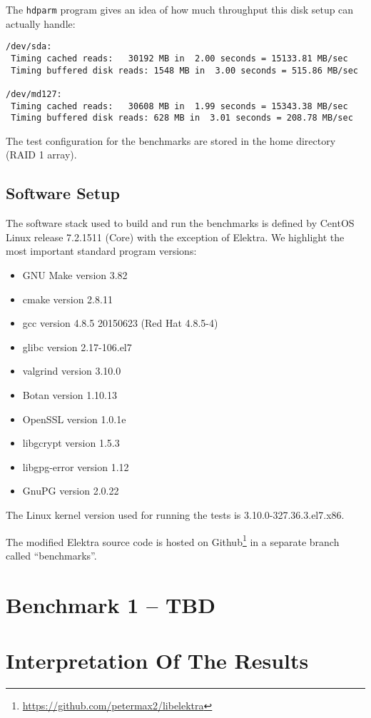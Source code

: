 The \texttt{hdparm} program gives an idea of how much throughput this disk setup can actually handle:

\begin{lstlisting}[caption={Disk performance on the benchmark machine}]
/dev/sda:
 Timing cached reads:   30192 MB in  2.00 seconds = 15133.81 MB/sec
 Timing buffered disk reads: 1548 MB in  3.00 seconds = 515.86 MB/sec

/dev/md127:
 Timing cached reads:   30608 MB in  1.99 seconds = 15343.38 MB/sec
 Timing buffered disk reads: 628 MB in  3.01 seconds = 208.78 MB/sec
\end{lstlisting}

The test configuration for the benchmarks are stored in the home directory (RAID 1 array).

  \subsection{Software Setup}

The software stack used to build and run the benchmarks is defined by CentOS Linux release 7.2.1511 (Core) with the exception of Elektra.
We highlight the most important standard program versions:

\begin{itemize}
  \item GNU Make version 3.82
  \item cmake version 2.8.11
  \item gcc version 4.8.5 20150623 (Red Hat 4.8.5-4)
  \item glibc version 2.17-106.el7
  \item valgrind version 3.10.0
  \item Botan version 1.10.13
  \item OpenSSL version 1.0.1e
  \item libgcrypt version 1.5.3
  \item libgpg-error version 1.12
  \item GnuPG version 2.0.22
\end{itemize}

The Linux kernel version used for running the tests is 3.10.0-327.36.3.el7.x86.

The modified Elektra source code is hosted on Github\footnote{\url{https://github.com/petermax2/libelektra}} in a separate branch called ``benchmarks''.

\section{Benchmark 1 -- TBD}

\section{Interpretation Of The Results}
